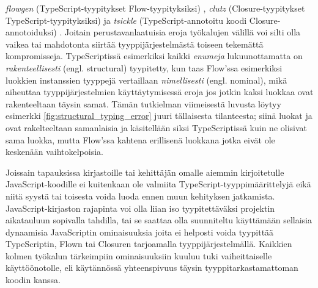 \textit{flowgen} (TypeScript-tyypitykset Flow-tyypityksiksi) \cite{Flowgen},
\textit{clutz}  (Closure-tyypitykset TypeScript-tyypityksiksi) \cite{Clutz}
ja \textit{tsickle} (TypeScript-annotoitu koodi Closure-annotoiduksi) \cite{Tsickle}.
Joitain perustavanlaatuisia eroja työkalujen välillä voi silti olla vaikea
tai mahdotonta siirtää tyyppijärjestelmästä toiseen tekemättä kompromisseja.
TypeScriptissä esimerkiksi kaikki \textit{enumeja} lukuunottamatta on
\textit{rakenteellisesti} (engl. structural) tyypitetty, kun taas Flow'ssa 
esimerkiksi luokkien instanssien tyyppejä vertaillaan \textit{nimellisesti}
(engl. nominal), mikä aiheuttaa tyyppijärjestelmien käyttäytymisessä eroja
jos jotkin kaksi luokkaa ovat rakenteeltaan täysin samat. Tämän tutkielman
viimeisestä luvusta löytyy esimerkki \ref{fig:structural_typing_error}
juuri tällaisesta tilanteesta; siinä luokat  ja
 ovat rakelteeltaan samanlaisia ja käsitellään siksi
TypeScriptissä kuin ne olisivat sama luokka, mutta Flow'ssa kahtena
erillisenä luokkana jotka eivät ole keskenään vaihtokelpoisia. 

Joissain tapauksissa kirjastoille tai kehittäjän omalle aiemmin kirjoitetulle
JavaScript-koodille ei kuitenkaan ole valmiita TypeScript-tyyppimäärittelyjä
eikä niitä syystä tai toisesta voida luoda ennen muun kehityksen jatkamista.
JavaScript-kirjaston rajapinta voi olla liian iso tyypitettäväksi projektin
aikatauluun sopivalla tahdilla, tai se saattaa olla suunniteltu käyttämään
sellaisia dynaamisia JavaScriptin ominaisuuksia joita ei helposti voida
tyypittää TypeScriptin, Flown tai Closuren tarjoamalla tyyppijärjestelmällä.
Kaikkien kolmen työkalun tärkeimpiin ominaisuuksiin kuuluu tuki vaiheittaiselle
käyttöönotolle, eli käytännössä yhteenspivuus täysin tyyppitarkastamattoman
koodin kanssa.

